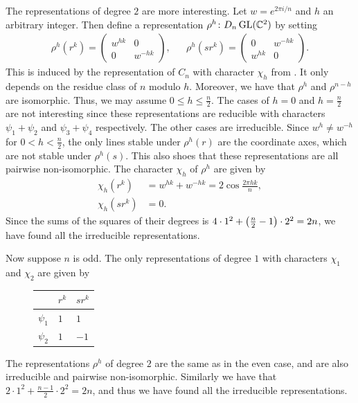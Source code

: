 \documentclass[letterpaper, 11pt, oneside]{book}
\begin{document}
\begin{ex}
  The representations of degree $2$ are more interesting.
  Let $w = e^{2 \pi i / n}$ and $h$ an arbitrary integer.
  Then define a representation $\rho^{h}\colon D_{n} \operatorname{GL}(\mathbb{C}^{2})$ by setting
  \begin{align*}
    \rho^{h}(r^{k}) = \begin{pmatrix} w^{hk} & 0 \\ 0 & w^{-hk} \end{pmatrix}, && \rho^{h}(sr^{k}) = \begin{pmatrix} 0 & w^{-hk} \\ w^{hk} & 0 \end{pmatrix}.
  \end{align*}
  This is induced by the representation of $C_{n}$ with character $\chi_{h}$ from .
  It only depends on the residue class of $n$ modulo $h$.
  Moreover, we have that $\rho^{h}$ and $\rho^{n - h}$ are isomorphic.
  Thus, we may assume $0 \leq h \leq \frac{n}{2}$.
  The cases of $h = 0$ and $h = \frac{n}{2}$ are not interesting since these representations are reducible with characters $\psi_{1} + \psi_{2}$ and $\psi_{3} + \psi_{4}$ respectively.
  The other cases are irreducible.
  Since $w^{h} \neq w^{-h}$ for $0 < h < \frac{n}{2}$, the only lines stable under $\rho^{h}(r)$ are the coordinate axes, which are not stable under $\rho^{h}(s)$.
  This also shoes that these representations are all pairwise non-isomorphic.
  The character $\chi_{h}$ of $\rho^{h}$ are given by
  \begin{align*}
    \chi_{h}(r^{k})  &= w^{hk} + w^{-hk} = 2 \cos \frac{2 \pi h k}{n}, \\
    \chi_{h}(sr^{k}) &= 0.
  \end{align*}
  Since the sums of the squares of their degrees is $4 \cdot 1^{2} + \pqty{\frac{n}{2} - 1} \cdot 2^{2} = 2n$, we have found all the irreducible representations.

  Now suppose $n$ is odd.
  The only representations of degree $1$ with characters $\chi_{1}$ and $\chi_{2}$ are given by
  \begin{figure}[h]
    \centering
    \begin{tabular}{l|ll}
               & $r^{k}$ & $sr^{k}$ \\\hline
      $\psi_1$ & $1$ & $1$ \\
      $\psi_2$ & $1$ & $-1$
    \end{tabular}
  \end{figure}
  The representations $\rho^{h}$ of degree $2$ are the same as in the even case, and are also irreducible and pairwise non-isomorphic.
  Similarly we have that $2 \cdot 1^{2} + \frac{n - 1}{2} \cdot 2^{2} = 2n$, and thus we have found all the irreducible representations.
\end{ex}
\end{document}
